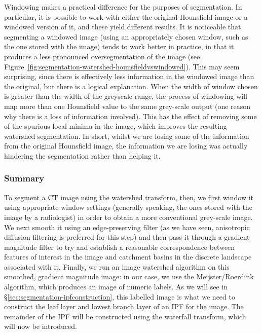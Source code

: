 Windowing makes a practical difference for the purposes of segmentation. In particular, it is possible to work with either the original Hounsfield image or a windowed version of it, and these yield different results. It is noticeable that segmenting a windowed image (using an appropriately chosen window, such as the one stored with the image) tends to work better in practice, in that it produces a less pronounced oversegmentation of the image (see Figure~\ref{fig:segmentation-watershed-hounsfieldvswindowed}). This may seem surprising, since there is effectively less information in the windowed image than the original, but there is a logical explanation. When the width of window chosen is greater than the width of the greyscale range, the process of windowing will map more than one Hounsfield value to the same grey-scale output (one reason why there is a loss of information involved). This has the effect of removing some of the spurious local minima in the image, which improves the resulting watershed segmentation. In short, whilst we are losing some of the information from the original Hounsfield image, the information we are losing was actually hindering the segmentation rather than helping it.


\subsubsection{Summary}

To segment a CT image using the watershed transform, then, we first window it using appropriate window settings (generally speaking, the ones stored with the image by a radiologist) in order to obtain a more conventional grey-scale image. We next smooth it using an edge-preserving filter (as we have seen, anisotropic diffusion filtering is preferred for this step) and then pass it through a gradient magnitude filter to try and establish a reasonable correspondence between features of interest in the image and catchment basins in the discrete landscape associated with it. Finally, we run an image watershed algorithm on this smoothed, gradient magnitude image: in our case, we use the Meijster/Roerdink algorithm, which produces an image of numeric labels. As we will see in \S\ref{sec:segmentation-ipfconstruction}, this labelled image is what we need to construct the leaf layer and lowest branch layer of an IPF for the image. The remainder of the IPF will be constructed using the waterfall transform, which will now be introduced.

